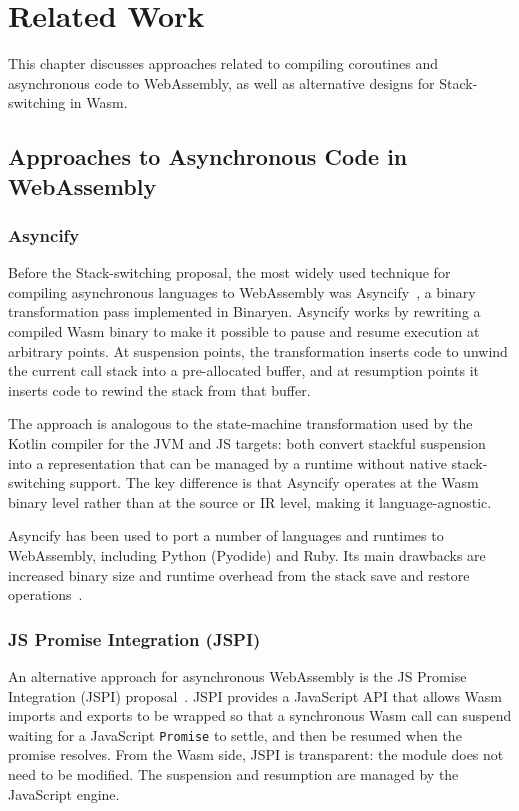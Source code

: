 \chapter{Related Work}
\label{ch:related-work}
\raggedbottom

This chapter discusses approaches related to compiling coroutines and asynchronous code to WebAssembly,
as well as alternative designs for Stack-switching in Wasm.

\section{Approaches to Asynchronous Code in WebAssembly}

\subsection{Asyncify}

Before the Stack-switching proposal, the most widely used technique for compiling asynchronous languages to
WebAssembly was Asyncify~\cite{asyncify}, a binary transformation pass implemented in Binaryen.
Asyncify works by rewriting a compiled Wasm binary to make it possible to pause and resume execution at
arbitrary points. At suspension points, the transformation inserts code to unwind the current call stack
into a pre-allocated buffer, and at resumption points it inserts code to rewind the stack from that buffer.

The approach is analogous to the state-machine transformation used by the Kotlin compiler for the JVM and JS
targets: both convert stackful suspension into a representation that can be managed by a
runtime without native stack-switching support. The key difference is that Asyncify operates at the Wasm
binary level rather than at the source or IR level, making it language-agnostic.

Asyncify has been used to port a number of languages and runtimes to WebAssembly, including Python (Pyodide)
and Ruby. Its main drawbacks are increased binary size and runtime overhead from the stack save and restore
operations~\cite{asyncify}.

\subsection{JS Promise Integration (JSPI)}

An alternative approach for asynchronous WebAssembly is the JS Promise Integration (JSPI) proposal~\cite{jspi-proposal}.
JSPI provides a JavaScript API that allows Wasm imports and exports to be wrapped so that a
synchronous Wasm call can suspend waiting for a JavaScript \texttt{Promise} to settle, and then be resumed
when the promise resolves. From the Wasm side, JSPI is transparent: the module does not need to be modified.
The suspension and resumption are managed by the JavaScript engine.

